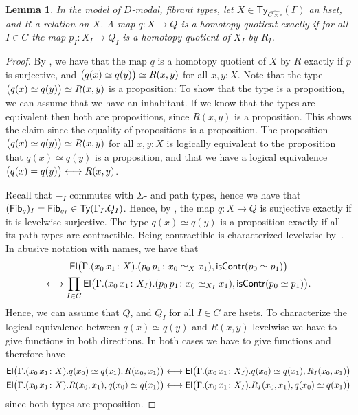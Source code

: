 \documentclass[10pt,a4paper]{article}
\newtheorem{lemma}{Lemma}[section]
\newcommand\Ty{\mathsf{Ty}}
\newcommand\El{\mathsf{El}}
\DeclarePairedDelimiter\paren{(}{)}
\newcommand\Fib{\mathsf{Fib}}
\newcommand\isContr{\mathsf{isContr}}
\begin{document}
\begin{lemma}\label{prop:homotopy-quotient-are-levelwise}
  In the model of $D$-modal, fibrant types, let $X \in \Ty_{\widehat{C \times \square}}(\Gamma)$ an hset, and $R$ a relation on $X$.
  A map $q \colon X \to Q$ is a homotopy quotient exactly if for all $I \in C$ the map $p_I \colon X_I \to Q_I$ is a homotopy quotient of $X_I$ by $R_I$.
\end{lemma}
\begin{proof}
  By \cite[Theorem 18.2.3]{rijke2025intro}, we have that the map $q$ is a homotopy quotient of $X$ by $R$ exactly if $p$ is surjective, and $\paren[\big]{q(x) \simeq q(y)} \simeq R(x, y)$ for all $x, y \colon X$.
  Note that the type $\paren[\big]{q(x) \simeq q(y)} \simeq R(x, y)$ is a proposition:
  To show that the type is a proposition, we can assume that we have an inhabitant.
  If we know that the types are equivalent then both are propositions, since $R(x, y)$ is a proposition.
  This shows the claim since the equality of propositions is a proposition.
  The proposition $\paren[\big]{q(x) \simeq q(y)} \simeq R(x, y)$ for all $x, y \colon X$ is logically equivalent to the proposition that $q(x) \simeq q(y)$ is a proposition, and that we have a logical equivalence $\paren[\big]{q(x) = q(y)} \longleftrightarrow R(x,y)$.

  Recall that $-_I$ commutes with $\Sigma$- and path types, hence we have that $\paren{\Fib_{q}}_I = \Fib_{q_I} \in \Ty(\Gamma_I.Q_I)$.
  Hence, by , the map $q \colon X \to Q$ is surjective exactly if it is levelwise surjective.
  The type $q(x) \simeq q(y)$ is a proposition exactly if all its path types are contractible. %
  Being contractible is characterized levelwise by~\cite[Proposition~16]{CRS21}.
  In abusive notation with names, we have that
  \begin{multline*}
    \El\paren[\big]{\Gamma.(x_0\,x_1\colon X).(p_0\,p_1\colon x_0 \simeq_X x_1), \isContr(p_0 \simeq p_1)} \\
    \longleftrightarrow \prod_{I \in C}
    \El\paren[\big]{\Gamma.(x_0\,x_1\colon X_I).(p_0\,p_1\colon x_0 \simeq_{X_I} x_1), \isContr(p_0 \simeq p_1)}.
  \end{multline*}
  Hence, we can assume that $Q$, and $Q_I$ for all $I \in C$ are hsets.
  To characterize the logical equivalence between $q(x) \simeq q(y)$ and $R(x, y)$ levelwise we have to give functions in both directions.
  In both cases we have to give functions and therefore have
  \begin{align*}
    \El\paren[\big]{ \Gamma.(x_0\,x_1\colon X).q(x_0) \simeq q(x_1) , R(x_0, x_1) } \longleftrightarrow \El\paren[\big]{ \Gamma.(x_0\,x_1\colon X_I).q(x_0) \simeq q(x_1) , R_I(x_0, x_1) } \\
    \El\paren[\big]{ \Gamma.(x_0\,x_1\colon X).R(x_0, x_1), q(x_0) \simeq q(x_1) } \longleftrightarrow \El\paren[\big]{ \Gamma.(x_0\,x_1\colon X_I).R_I(x_0, x_1), q(x_0) \simeq q(x_1) }
  \end{align*}
  since both types are proposition.
\end{proof}
\end{document}
